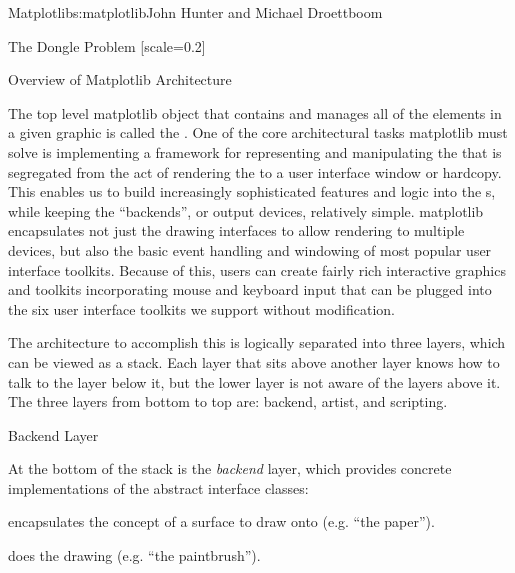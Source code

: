 \begin{aosachapter}{Matplotlib}{s:matplotlib}{John Hunter and Michael Droettboom}
\begin{aosasect1}{The Dongle Problem}
[scale=0.2]

\end{aosasect1}

\begin{aosasect1}{Overview of Matplotlib Architecture}

The top level matplotlib object that contains and manages all of the
elements in a given graphic is called the .  One of the
core architectural tasks matplotlib must solve is implementing a
framework for representing and manipulating the  that
is segregated from the act of rendering the  to a user
interface window or hardcopy.  This enables us to build increasingly
sophisticated features and logic into the s, while
keeping the ``backends'', or output devices, relatively simple.
matplotlib encapsulates not just the drawing interfaces to allow
rendering to multiple devices, but also the basic event
handling and windowing of most popular user interface toolkits.
Because of this, users can create fairly rich interactive graphics
and toolkits incorporating mouse and keyboard input that can be
plugged into the six user interface toolkits we support without
modification.

The architecture to accomplish this is logically separated into three
layers, which can be viewed as a stack.  Each layer that sits above
another layer knows how to talk to the layer below it, but the lower
layer is not aware of the layers above it.  The three layers from
bottom to top are: backend, artist, and scripting.


\begin{aosasect2}{Backend Layer}

At the bottom of the stack is the \emph{backend} layer, which provides
concrete implementations of the abstract interface classes:
\begin{aosaitemize}
\item {} encapsulates the concept of a surface to draw
  onto (e.g. ``the paper'').

\item {} does the drawing (e.g. ``the paintbrush'').


\end{aosaitemize}
\end{aosasect2}
\end{aosasect1}
\end{aosachapter}
